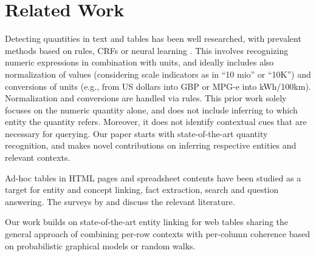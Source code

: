 
\section{Related Work}
\label{sec:related-work}

Detecting quantities in text and tables has been well researched,
with prevalent methods based on rules, CRFs or neural learning
\cite{DBLP:conf/kdd/SarawagiC14, DBLP:journals/tacl/RoyVR15,DBLP:conf/aaai/MadaanMMRS16, DBLP:conf/sigir/AlonsoS18,DBLP:conf/acl/SahaPM17,DBLP:conf/cikm/IbrahimRW16}. 
This involves recognizing numeric expressions in combination with
units, and ideally includes also normalization of values
(considering scale indicators as in ``10 mio'' or ``10K'')
and conversions of units (e.g., from US dollars into GBP
or MPG-e into kWh/100km).
Normalization and conversions are handled via rules.
%
This prior work solely focuses on the numeric quantity alone,
and does not include inferring to which entity the quantity
refers.
Moreover, it does not identify contextual cues that
are necessary for querying. 
Our paper starts with state-of-the-art quantity recognition,
and makes novel contributions on inferring 
respective entities and relevant contexts.


\vspace{0.1cm}


Ad-hoc tables in HTML pages and spreadsheet contents
have been studied as a target for entity and concept linking,
fact extraction, search and question answering.
The surveys by \cite{DBLP:journals/pvldb/CafarellaHLMYWW18} and \cite{DBLP:journals/tist/ZhangB20} discuss the relevant literature.

%
Our work builds on state-of-the-art entity linking
for web tables
\cite{
DBLP:journals/pvldb/LimayeSC10, 
DBLP:conf/semweb/BhagavatulaND15, DBLP:conf/cikm/IbrahimRW16, DBLP:conf/semweb/EfthymiouHRC17, DBLP:conf/edbt/RitzeB17}
sharing the general approach of combining per-row contexts
with per-column coherence based on probabilistic graphical models
or random walks.

